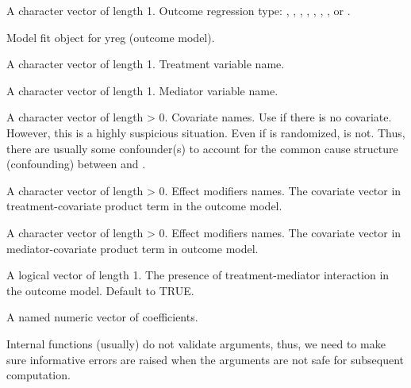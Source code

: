 \documentclass[a4paper]{book}
\begin{document}
\begin{Arguments}
\begin{ldescription}
\item[\code{yreg}] A character vector of length 1. Outcome regression type: , , , , , , , or .

\item[\code{yreg\_fit}] Model fit object for yreg (outcome model).

\item[\code{avar}] A character vector of length 1. Treatment variable name.

\item[\code{mvar}] A character vector of length 1. Mediator variable name.

\item[\code{cvar}] A character vector of length > 0. Covariate names. Use  if there is no covariate. However, this is a highly suspicious situation. Even if  is randomized,  is not. Thus, there are usually some confounder(s) to account for the common cause structure (confounding) between  and .

\item[\code{emm\_ac\_yreg}] A character vector of length > 0. Effect modifiers names. The covariate vector in treatment-covariate product term in the outcome model.

\item[\code{emm\_mc\_yreg}] A character vector of length > 0. Effect modifiers names. The covariate vector in mediator-covariate product term in outcome model.

\item[\code{interaction}] A logical vector of length 1. The presence of treatment-mediator interaction in the outcome model. Default to TRUE.
\end{ldescription}
\end{Arguments}
%
\begin{Value}
A named numeric vector of coefficients.
\end{Value}
%
\begin{Description}
Internal functions (usually) do not validate arguments, thus, we need to make sure informative errors are raised when the arguments are not safe for subsequent computation.
\end{Description}
\end{document}
